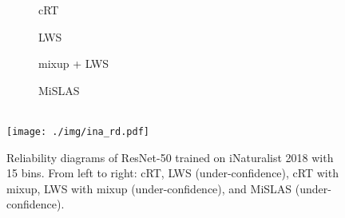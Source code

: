 \documentclass[final]{cvpr}
\begin{document}
	\begin{figure}[h]
		\begin{subfigure}{0.195\linewidth}
			\begin{center}
				{\quad \quad cRT}
			\end{center}
		\end{subfigure}
		\hfill
		\begin{subfigure}{0.195\linewidth}
			\centering
			{\quad   \hspace{1.5pt}  LWS}
		\end{subfigure}
		\hfill
		\begin{subfigure}{0.195\linewidth}
			\centering
			{}
		\end{subfigure} 
		\hfill
		\begin{subfigure}{0.195\linewidth}
			\centering
			{\quad \hspace{-5pt}  mixup + LWS}
		\end{subfigure} 
		\hfill
		\begin{subfigure}{0.195\linewidth}
			\centering
			{MiSLAS}
		\end{subfigure}\\
		\centering
		\texttt{[image: ./img/ina\_rd.pdf]} \\
		\vspace{-5pt}
		\caption{Reliability diagrams of ResNet-50 trained on iNaturalist 2018 with 15 bins. From left to right: cRT, LWS (under-confidence), cRT with mixup, LWS with mixup (under-confidence), and MiSLAS (under-confidence).} 
		\vspace{-10pt}
		\label{fig:more_rd_inat}
	\end{figure}
	
	\clearpage
\end{document}

